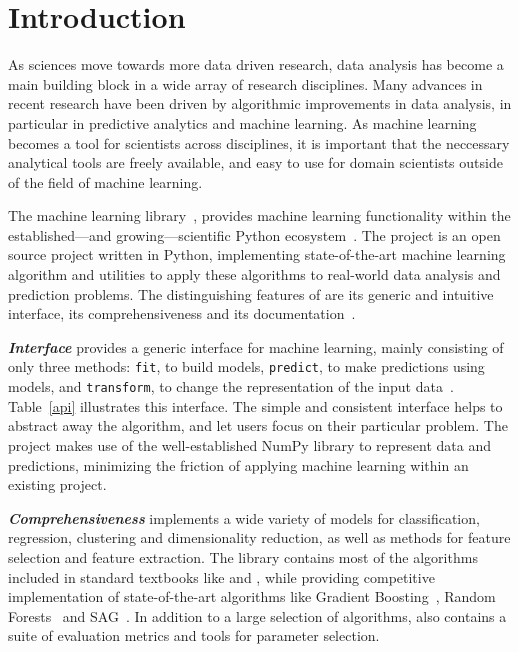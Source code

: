 \setcounter{section}{0}
\section{Introduction}
As sciences move towards more data driven research, data analysis has
become a main building block in a wide array of research disciplines.
Many advances in recent research have been driven by algorithmic improvements
in data analysis, in particular in predictive analytics and machine learning.
As machine learning becomes a tool for scientists across disciplines, it is
important that the neccessary analytical tools are freely available, and easy to use for
domain scientists outside of the field of machine learning.


The \sklearn{} machine learning library~\autocite{pedregosa2011scikit},
provides machine learning functionality within the established---and
growing---scientific Python ecosystem~\autocite{benlorica, infoworld}.
The \sklearn{} project is an open source project written in Python, implementing
state-of-the-art machine
learning algorithm and utilities to apply these algorithms to real-world data
analysis and prediction problems.
%
The distinguishing features of \sklearn{} are its generic and intuitive
interface, its comprehensiveness and its
documentation~\autocite{Varoquaux_2015, benlorica}.

\emph{\textbf{Interface}} \sklearn{} provides a generic interface for machine
learning, mainly consisting of only three methods: \texttt{fit}, to build
models, \texttt{predict}, to make predictions using models, and
\texttt{transform}, to change the representation of the input
data~\autocite{buitinck2013api}.
Table~\ref{api} illustrates this interface. The
simple and consistent interface helps to abstract away the algorithm, and let
users focus on their particular problem. The \sklearn{} project{} makes use of the
well-established NumPy library to represent data and predictions, minimizing
the friction of applying machine learning within an existing project.

\emph{\textbf{Comprehensiveness}} \sklearn{} implements a wide variety of
models for classification, regression, clustering and dimensionality reduction,
as well as methods for feature selection and feature extraction. The library
contains most of the algorithms included in standard textbooks like
\textcite{bishop2001bishop} and \textcite{friedman2001elements}, while
providing competitive implementation of state-of-the-art algorithms like
Gradient Boosting~\autocite{friedman2001greedy}, Random
Forests~\autocite{breiman2001random} and SAG~\autocite{roux2012stochastic}.  In
addition to a large selection of algorithms, \sklearn{} also contains a suite
of evaluation metrics and tools for parameter selection.

